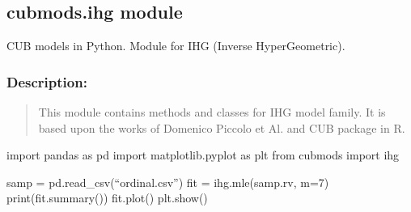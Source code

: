 \documentclass[letterpaper,10pt,english]{sphinxmanual}
\begin{document}
\subsection{cubmods.ihg module}
\label{\detokenize{cubmods:module-cubmods.ihg}}\label{\detokenize{cubmods:cubmods-ihg-module}}
\sphinxAtStartPar
CUB models in Python.
Module for IHG (Inverse HyperGeometric).


\subsubsection{Description:}
\label{\detokenize{cubmods:id249}}\begin{quote}

\sphinxAtStartPar
This module contains methods and classes
for IHG model family.
It is based upon the works of Domenico
Piccolo et Al. and CUB package in R.
\end{quote}
\begin{description}
\sphinxAtStartPar
import pandas as pd
import matplotlib.pyplot as plt
from cubmods import ihg

\sphinxAtStartPar
samp = pd.read\_csv(“ordinal.csv”)
fit = ihg.mle(samp.rv, m=7)
print(fit.summary())
fit.plot()
plt.show()

\end{description}
\end{document}
